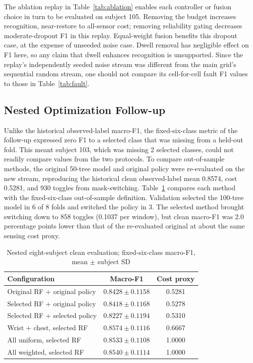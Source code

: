 \documentclass[conference]{IEEEtran}
\begin{document}
The ablation replay in Table~\ref{tab:ablation} enables each controller or fusion choice in turn to be evaluated on subject 105. Removing the budget increases recognition, near-restore to all-sensor cost; removing reliability gating decreases moderate-dropout F1 in this replay. Equal-weight fusion benefits this dropout case, at the expense of unseeded noise case. Dwell removal has negligible effect on F1 here, so any claim that dwell enhances recognition is unsupported. Since the replay's independently seeded noise stream was different from the main grid's sequential random stream, one should not compare its cell-for-cell fault F1 values to those in Table~\ref{tab:fault}.

\subsection{Nested Optimization Follow-up}

Unlike the historical observed-label macro-F1, the fixed-six-class metric of the follow-up expressed zero F1 to a selected class that was missing from a held-out fold. This meant subject 103, which was missing 2 selected classes, could not readily compare values from the two protocols. To compare out-of-sample methods, the original 50-tree model and original policy were re-evaluated on the new stream, reproducing the historical clean observed-label mean 0.8574, cost 0.5281, and 930 toggles from mask-switching. Table~\ref{tab:nested_clean} compares each method with the fixed-six-class out-of-sample definition. Validation selected the 100-tree model in 6 of 8 folds and switched the policy in 3. The selected method brought switching down to 858 toggles (0.1037 per window), but clean macro-F1 was 2.0 percentage points lower than that of the re-evaluated original at about the same sensing cost proxy.

\begin{table}[t]
\caption{Nested eight-subject clean evaluation; fixed-six-class macro-F1, mean $\pm$ subject SD}
\centering\scriptsize
\begin{tabular}{lcc}
\toprule Configuration & Macro-F1 & Cost proxy \\
\midrule
Original RF + original policy & $0.8428\pm0.1158$ & 0.5281 \\
Selected RF + original policy & $0.8418\pm0.1168$ & 0.5278 \\
Selected RF + selected policy & $0.8227\pm0.1194$ & 0.5310 \\
Wrist + chest, selected RF & $0.8574\pm0.1116$ & 0.6667 \\
All uniform, selected RF & $0.8533\pm0.1108$ & 1.0000 \\
All weighted, selected RF & $0.8540\pm0.1114$ & 1.0000 \\
\bottomrule
\end{tabular}
\label{tab:nested_clean}
\end{table}
\end{document}
